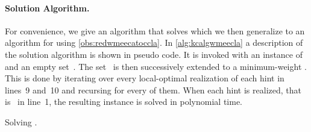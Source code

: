 \paragraph{Solution Algorithm.} For convenience, we give an algorithm that solves \pWMEECCLAs{} which we then generalize to an algorithm for \pWMEECAs{} using \autoref{obs:redwmeecatoccla}. In \autoref{alg:kcalgwmeecla} a description of the solution algorithm is shown in pseudo code. It is invoked with an instance of \pWMEECCLAs{} and an empty set~. The set~ is then successively extended to a minimum-weight \EE . This is done by iterating over every local-optimal realization of each hint in lines~9 and~10 and recursing for every of them. When each hint is realized, that is~ in line~1, the resulting instance is solved in polynomial time.

\begin{algorithm}
  \LinesNumbered
  


  \BlankLine
  
  \caption{Solving \pWMEECCLAs{}.}
  \label{alg:kcalgwmeecla}
\end{algorithm}
